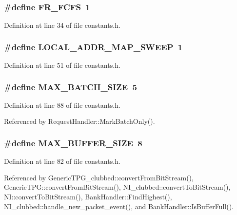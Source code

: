 \subsubsection[{FR\_\-FCFS}]{\setlength{\rightskip}{0pt plus 5cm}\#define FR\_\-FCFS~1}\label{constants_8h_4f2879b212b6c2b6b20e445d175e9254}




Definition at line 34 of file constants.h.
\subsubsection[{LOCAL\_\-ADDR\_\-MAP\_\-SWEEP}]{\setlength{\rightskip}{0pt plus 5cm}\#define LOCAL\_\-ADDR\_\-MAP\_\-SWEEP~1}\label{constants_8h_fc2c879709cd2692f28d8d204b1f0341}




Definition at line 51 of file constants.h.
\subsubsection[{MAX\_\-BATCH\_\-SIZE}]{\setlength{\rightskip}{0pt plus 5cm}\#define MAX\_\-BATCH\_\-SIZE~5}\label{constants_8h_18373cd65e0761a3bd4e760a8e015baa}




Definition at line 88 of file constants.h.

Referenced by RequestHandler::MarkBatchOnly().
\subsubsection[{MAX\_\-BUFFER\_\-SIZE}]{\setlength{\rightskip}{0pt plus 5cm}\#define MAX\_\-BUFFER\_\-SIZE~8}\label{constants_8h_d4d796b98c583d49e83adabd74a63bf6}




Definition at line 82 of file constants.h.

Referenced by GenericTPG\_\-clubbed::convertFromBitStream(), GenericTPG::convertFromBitStream(), NI\_\-clubbed::convertToBitStream(), NI::convertToBitStream(), BankHandler::FindHighest(), NI\_\-clubbed::handle\_\-new\_\-packet\_\-event(), and BankHandler::IsBufferFull().
